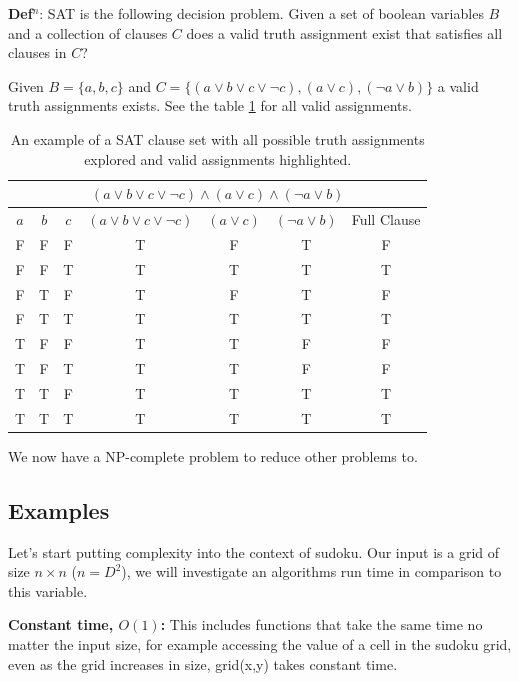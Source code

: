 \documentclass[a4paper,11pt]{report}
\newcounter{row}
\newcounter{col}
\begin{document}
\textbf{Def$^n$}: SAT is the following decision problem. Given a set of boolean variables $B$ and a collection of clauses $C$ does a valid truth assignment exist that satisfies all clauses in $C$?

Given $B = \{a,b,c\}$ and  $C=\{(a\lor b \lor c \lor \neg c), (a \lor c), (\neg a\lor b)\}$ a valid truth assignments exists. See the table \ref{satex} for all valid assignments.

\begin{table}
\begin{center}
\begin{tabular}{ |c|c|c|c|c|c|c|  }
 \hline
 \multicolumn{7}{|c|}{$(a\lor b \lor c \lor \neg c)\land (a \lor c) \land (\neg a\lor b)$} \\
 \hline
$a$ & $b$ & $c$ & $(a\lor b \lor c \lor \neg c)$ & $(a \lor c)$ & $(\neg a\lor b)$ & Full Clause\\
 \hline
 F & F & F & T & F & T & F \\
\rowcolor{lightgray}
 F & F & T & T & T & T & T \\
 F & T & F & T & F & T & F \\
\rowcolor{lightgray}
 F & T & T & T & T & T & T \\
 T & F & F & T & T & F & F \\
 T & F & T & T & T & F & F \\
\rowcolor{lightgray}
 T & T & F & T & T & T & T \\
\rowcolor{lightgray}
 T & T & T & T & T & T & T \\
 \hline
\end{tabular}
\end{center}
\caption{\label{satex}An example of a SAT clause set with all possible truth assignments explored and valid assignments highlighted.}
\end{table}

We now have a NP-complete problem to reduce other problems to.

\subsection{Examples}

Let's start putting complexity into the context of sudoku. Our input is a grid of size $n\times n$ ($n=D^2$), we will investigate an algorithms run time in comparison to this variable.

\textbf{Constant time, $O(1)$:} This includes functions that take the same time no matter the input size, for example accessing the value of a cell in the sudoku grid, even as the grid increases in size, grid(x,y) takes constant time.
\end{document}
